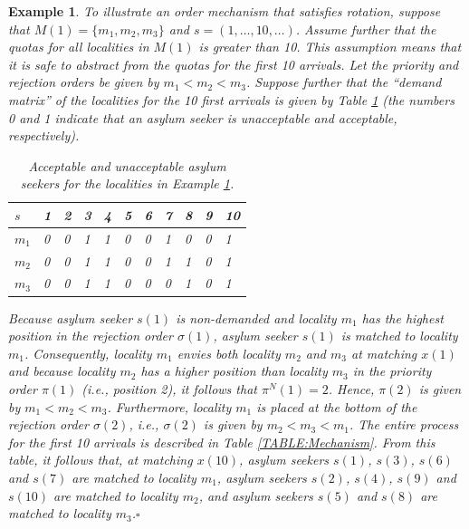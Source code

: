 \documentclass[12pt,fleqn]{article}
\newtheorem{example}{Example}
\begin{document}
\begin{example}\rm\label{EX:Mechanism}
To illustrate an order mechanism that satisfies rotation, suppose that $M(1)=\{m_1,m_2,m_3\}$ and $s=(1,\ldots,10,\ldots)$. Assume further that the quotas for all localities in $M(1)$ is greater than 10. This assumption means that it is safe to abstract from the quotas for the first 10 arrivals. Let the priority and rejection orders be given by $m_1<m_2<m_3$. Suppose further that the ``demand matrix'' of the localities for the 10 first arrivals is given by Table \ref{TABLE:Demand} (the numbers 0 and 1 indicate that an asylum seeker is unacceptable and acceptable, respectively).

\begin{table}[h!]
\caption{Acceptable and unacceptable asylum seekers for the localities in Example \ref{TABLE:Demand}.}\label{TABLE:Demand}
\begin{tabular}{lllllllllll}\hline
$s$   & 1 & 2 & 3 & 4 & 5 & 6 & 7 & 8 & 9 & 10 \\ \hline
$m_1$ & 0 & 0 & 1 & 1 & 0 & 0 & 1 & 0 & 0 & 1\\
$m_2$ & 0 & 0 & 1 & 1 & 0 & 0 & 1 & 1 & 0 & 1\\
$m_3$ & 0 & 0 & 1 & 1 & 0 & 0 & 0 & 1 & 0 & 1\\ \hline
\end{tabular}
\end{table}

\noindent Because asylum seeker $s(1)$ is non-demanded and locality $m_1$ has the highest position in the rejection order $\sigma(1)$, asylum seeker $s(1)$ is matched to locality $m_1$. Consequently, locality $m_1$ envies both locality $m_2$ and $m_3$ at matching $x(1)$ and because locality $m_2$ has a higher position than locality $m_3$ in the priority order $\pi(1)$ (i.e., position 2), it follows that $\pi^N(1)=2$. Hence, $\pi(2)$ is given by $m_1<m_2<m_3$. Furthermore, locality $m_1$ is placed at the bottom of the rejection order $\sigma(2)$, i.e., $\sigma(2)$ is given by $m_2<m_3<m_1$. The entire process for the first 10 arrivals is described in Table \ref{TABLE:Mechanism}. From this table, it follows that, at matching $x(10)$, asylum seekers $s(1)$, $s(3)$, $s(6)$ and $s(7)$ are matched to locality $m_1$, asylum seekers $s(2)$, $s(4)$, $s(9)$ and $s(10)$ are matched to locality $m_2$, and asylum seekers $s(5)$ and $s(8)$ are matched to locality $m_3$.\hfill $\square$
\end{example}
\end{document}
